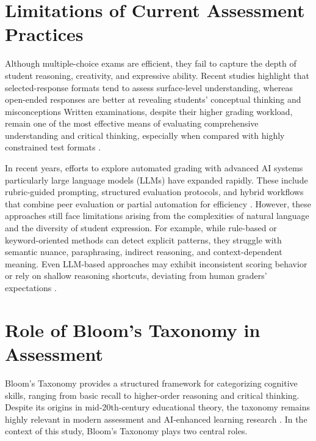 \section{Limitations of Current Assessment Practices}

Although multiple-choice exams are efficient, they fail to capture the 
depth of student reasoning, creativity, and expressive ability. 
Recent studies highlight that selected-response formats tend 
to assess surface-level understanding, whereas open-ended 
responses are better at revealing students’ conceptual 
thinking and misconceptions \citep{dossey2024automated, policar2025automated}
Written examinations, despite their higher grading workload, remain 
one of the most effective means of evaluating comprehensive 
understanding and critical thinking, especially when compared 
with highly constrained test formats 
\citep{emirtekin2025systematic, fuller2024rubric}.

In recent years, efforts to explore automated grading with 
advanced AI systems particularly large language models 
(LLMs) have expanded rapidly. These include rubric-guided 
prompting, structured evaluation protocols, and hybrid 
workflows that combine peer evaluation or partial automation 
for efficiency 
\citep{xie2024gradelikehuman, tang2025autograding}. 
However, these approaches still face limitations arising from 
the complexities of natural language and the diversity of 
student expression. For example, while rule-based or 
keyword-oriented methods can detect explicit patterns, they 
struggle with semantic nuance, paraphrasing, indirect 
reasoning, and context-dependent meaning. Even LLM-based 
approaches may exhibit inconsistent scoring behavior or rely 
on shallow reasoning shortcuts, deviating from human graders’ 
expectations 
\citep{wu2024unveilingscoring, emirtekin2025systematic}.

\section{Role of Bloom’s Taxonomy in Assessment}

Bloom’s Taxonomy provides a structured framework for 
categorizing cognitive skills, ranging from basic recall to 
higher-order reasoning and critical thinking. Despite its 
origins in mid‑20th‑century educational theory, the taxonomy 
remains highly relevant in modern assessment and AI‑enhanced 
learning research \citep{stanny2016reexamining, huber2025llms}. 
In the context of this study, Bloom’s Taxonomy plays two 
central roles.

